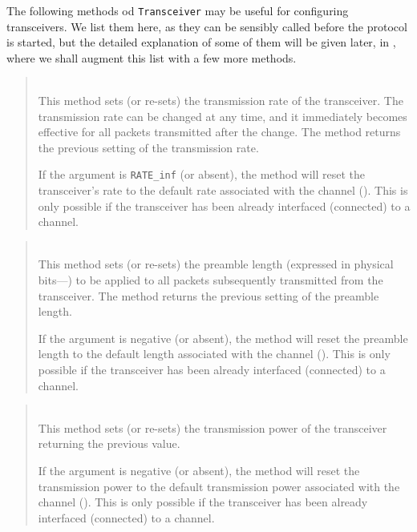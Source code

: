 The following methods od {\tt Transceiver} may be useful for configuring
transceivers.
We list them here,
as they can be sensibly called before the protocol is started,
but the detailed explanation of some of them will be given later, in
, where we shall augment this list with a few more methods.

\begin{quote}
\noindent{} \hspace{0in}\vspace{0.05in}\\
\noindent
This method sets (or re-sets) the transmission rate of the transceiver.
The transmission rate can be changed at any time, and it immediately
becomes effective for all packets transmitted after the change.
The method returns the previous setting of the transmission rate.

\noindent
If the argument is {\tt RATE\_inf} (or absent), the method will reset
the transceiver's rate to the default rate associated with the channel
().
This is only possible if the transceiver has been already interfaced (connected)
to a channel.
\end{quote}

\begin{quote}
\noindent{} \hspace{0in}\vspace{0.05in}\\
\noindent
This method sets (or re-sets) the preamble length
(expressed in physical bits---)
to be applied to all
packets subsequently transmitted from the transceiver.
The method returns the previous setting of the preamble length.

\noindent
If the argument is negative (or absent), the method will reset
the preamble length to the default length associated with the channel
().
This is only possible if the transceiver has been already interfaced (connected)
to a channel.
\end{quote}

\begin{quote}
\noindent{} \hspace{0in}\vspace{0.05in}\\
\noindent
This method sets (or re-sets) the transmission power of the transceiver
returning the previous value.

\noindent
If the argument is negative (or absent), the method will reset
the transmission power to the default transmission power
associated with the channel ().
This is only possible if the transceiver has been already interfaced (connected)
to a channel.
\end{quote}

